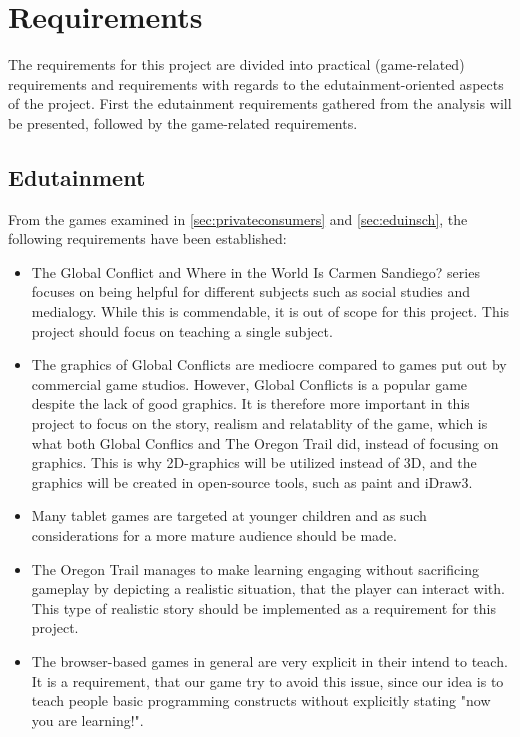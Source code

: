 \section{Requirements}
\label{sec:requirements}

The requirements for this project are divided into practical (game-related) requirements and requirements with regards to the edutainment-oriented 
aspects of the project. First the edutainment requirements gathered from the analysis will be presented, followed by the game-related requirements.

\subsection{Edutainment}

From the games examined in \autoref{sec:privateconsumers} and \autoref{sec:eduinsch}, the following requirements have been established: 

\begin{itemize}
	\item The Global Conflict and Where in the World Is Carmen Sandiego? series focuses on being helpful for different subjects such as social studies and medialogy. While this is commendable, it is out of scope for this project. This project should focus on teaching a single subject.
	
	\item The graphics of Global Conflicts are mediocre compared to games put out by commercial game studios. However, Global Conflicts is a popular game despite the lack of good graphics. It is therefore more important in this project to focus on the story, realism and relatablity of the game, which is what both Global Conflics and The Oregon Trail did, instead of focusing on graphics. This is why 2D-graphics will be utilized instead of 3D, and the graphics will be created in open-source tools, such as paint and iDraw3.
	
	\item Many tablet games are targeted at younger children and as such considerations for a more mature audience should be made.

	\item The Oregon Trail manages to make learning engaging without sacrificing gameplay by depicting a realistic situation, that the player can interact with. This type of realistic story should be implemented as a requirement for this project.

	\item The browser-based games in general are very explicit in their intend to teach. It is a requirement, that our game try to avoid this issue, since our idea is to teach people basic programming constructs without explicitly stating "now you are learning!". 
\end{itemize}

